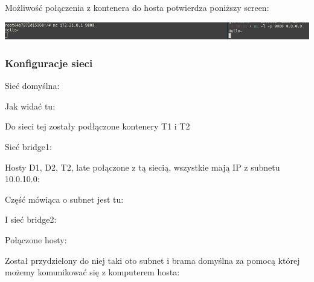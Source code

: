 \documentclass[12pt]{article}
\begin{document}
    Możliwość połączenia z kontenera do hosta potwierdza poniższy screen:

    \includegraphics[width=\textwidth]{pic1.png}

    \subsubsection{Konfiguracje sieci}

    Sieć domyślna:

    

    \vspace{0.5cm}

    Jak widać tu:

    

    Do sieci tej zostały podłączone kontenery T1 i T2

    \vspace{2cm}

    Sieć bridge1:

    

    \vspace{0.5cm}

    Hosty D1, D2, T2, late połączone z tą siecią, wszystkie mają IP z subnetu 10.0.10.0:

    

    Część mówiąca o subnet jest tu:

    

    \vspace{2cm}

    I sieć bridge2:

    
    \vspace{0.5cm}

    Połączone hosty:

    

    \vspace{0.5 cm}

    Został przydzielony do niej taki oto subnet i brama domyślna za pomocą której możemy komunikować się z komputerem hosta:

    
\end{document}
